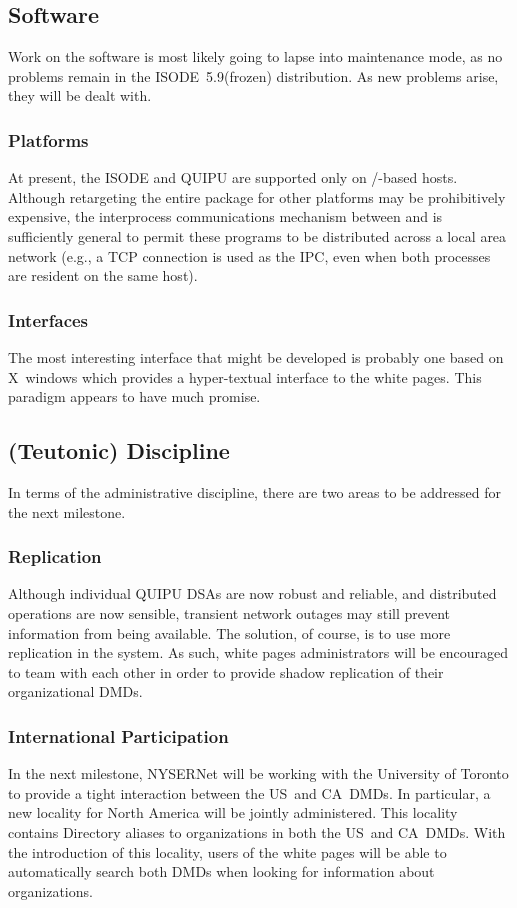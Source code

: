 \subsection	{Software}
Work on the software is most likely going to lapse into maintenance mode,
as no problems remain in the ISODE~5.9(frozen) distribution.
As new problems arise,
they will be dealt with.

\subsubsection	{Platforms}
At present,
the ISODE and QUIPU are supported only on \unix/-based hosts.
Although retargeting the entire package for other platforms may be
prohibitively expensive,
the interprocess communications mechanism between  and  is
sufficiently general to permit these programs to be distributed across a
local area network
(e.g., a TCP connection is used as the IPC,
even when both processes are resident on the same host).

\subsubsection	{Interfaces}
The most interesting interface that might be developed is probably one based on
X~windows which provides a hyper-textual interface to the white pages.
This paradigm appears to have much promise.

\subsection	{(Teutonic) Discipline}
In terms of the administrative discipline,
there are two areas to be addressed for the next milestone.

\subsubsection	{Replication}
Although individual QUIPU DSAs are now robust and reliable,
and distributed operations are now sensible,
transient network outages may still prevent information from being available.
The solution, of course, is to use more replication in the system.
As such,
white pages administrators will be encouraged to team with each other in order
to provide shadow replication of their organizational DMDs.

\subsubsection	{International Participation}
In the next milestone,
NYSERNet will be working with the University of Toronto to provide a tight
interaction between the US~and CA~DMDs.
In particular,
a new locality for North America will be jointly administered.
This locality contains Directory aliases to organizations in both the US~and
CA~DMDs.
With the introduction of this locality,
users of the white pages will be able to automatically search both DMDs when
looking for information about organizations.

